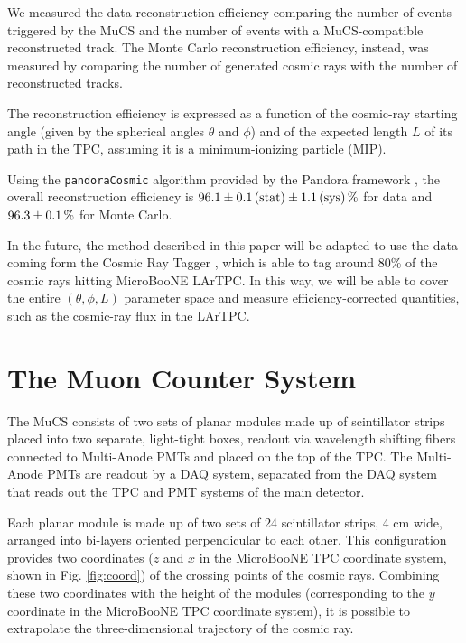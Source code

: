 \documentclass[a4paper]{scrartcl}
\begin{document}
We measured the data reconstruction efficiency comparing the number of events triggered by the MuCS and the number of events with a MuCS-compatible reconstructed track.
The Monte Carlo reconstruction efficiency, instead, was measured by comparing the number of generated cosmic rays with the number of reconstructed tracks.

The reconstruction efficiency is expressed as a function of the cosmic-ray starting angle (given by the spherical angles $\theta$ and $\phi$) and of the expected length $L$ of its path in the TPC, assuming it is a minimum-ionizing particle (MIP).

Using the \texttt{pan\-do\-ra\-Co\-smic} algorithm \cite{pandoracosmic} provided by the Pandora framework \cite{pandora}, the overall reconstruction efficiency is $96.1\pm0.1\thinspace(\mathrm{stat}) \pm 1.1\thinspace(\mathrm{sys})\thinspace\%$ for data and $96.3\pm0.1\thinspace\%$ for Monte Carlo.

In the future, the method described in this paper will be adapted to use the data coming form the Cosmic Ray Tagger \cite{crt}, which is able to tag around 80\% of the cosmic rays hitting MicroBooNE LArTPC. In this way, we will be able to cover the entire $(\theta,\phi,L)$ parameter space and measure efficiency-corrected quantities, such as the cosmic-ray flux in the LArTPC.

\section{The Muon Counter System}\label{sec:proc}
The MuCS consists of two sets of planar modules made up of scintillator strips placed into two separate, light-tight boxes, readout via wavelength shifting fibers connected to Multi-Anode PMTs and placed on the top of the TPC. The Multi-Anode PMTs are readout by a DAQ system, separated from the DAQ system that reads out the TPC and PMT systems of the main detector.

Each planar module is made up of two sets of 24 scintillator strips, 4 cm wide, arranged into bi-layers oriented perpendicular to each other. This configuration provides two coordinates ($z$ and $x$ in the MicroBooNE TPC coordinate system, shown in Fig. \ref{fig:coord}) of the crossing points of the cosmic rays. Combining these two coordinates with the height of the modules (corresponding to the $y$ coordinate in the MicroBooNE TPC coordinate system), it is possible to extrapolate the three-dimensional trajectory of the cosmic ray.
\end{document}
